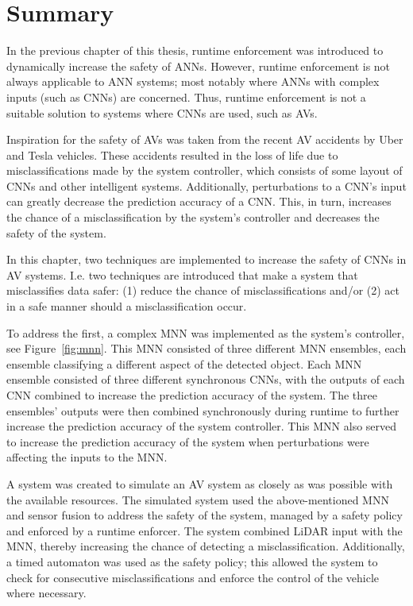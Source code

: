 \section{Summary}
In the previous chapter of this thesis, runtime enforcement was introduced to dynamically increase the safety of \acfp{ANN}.
However, runtime enforcement is not always applicable to \ac{ANN} systems; most notably where \acp{ANN} with complex inputs (such as \acfp{CNN}) are concerned.
Thus, runtime enforcement is not a suitable solution to systems where \acp{CNN} are used, such as \acfp{AV}.

Inspiration for the safety of \acp{AV} was taken from the recent \ac{AV} accidents by Uber and Tesla vehicles.
These accidents resulted in the loss of life due to misclassifications made by the system controller, which consists of some layout of \acp{CNN} and other intelligent systems.
Additionally, perturbations to a \ac{CNN}'s input can greatly decrease the prediction accuracy of a \ac{CNN}.
This, in turn, increases the chance of a misclassification by the system's controller and decreases the safety of the system.

In this chapter, two techniques are implemented to increase the safety of \acfp{CNN} in \acf{AV} systems.
I.e. two techniques are introduced that make a system that misclassifies data safer: (1) reduce the chance of misclassifications and/or (2) act in a safe manner should a misclassification occur.

To address the first, a complex \acf{MNN} was implemented as the system's controller, see Figure~\ref{fig:mnn}.
This \ac{MNN} consisted of three different \ac{MNN} ensembles, each ensemble classifying a different aspect of the detected object.
Each \ac{MNN} ensemble consisted of three different synchronous \acp{CNN}, with the outputs of each \ac{CNN} combined to increase the prediction accuracy of the system.
The three ensembles' outputs were then combined synchronously during runtime to further increase the prediction accuracy of the system controller.
This \ac{MNN} also served to increase the prediction accuracy of the system when perturbations were affecting the inputs to the \ac{MNN}.

A system was created to simulate an \ac{AV} system as closely as was possible with the available resources.
The simulated system used the above-mentioned \ac{MNN} and sensor fusion to address the safety of the system, managed by a safety policy and enforced by a runtime enforcer.
The system combined \acf{LiDAR} input with the \ac{MNN}, thereby increasing the chance of detecting a misclassification.
Additionally, a timed automaton was used as the safety policy; this allowed the system to check for consecutive misclassifications and enforce the control of the vehicle where necessary.

